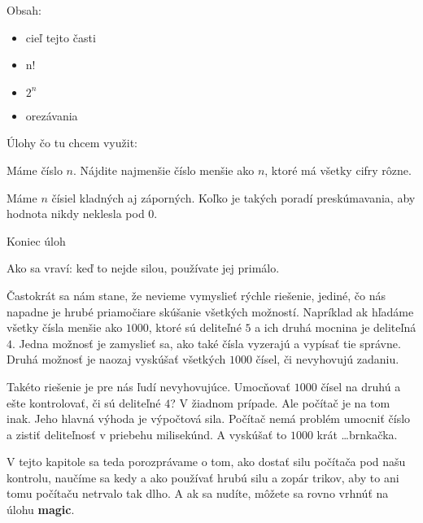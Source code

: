 





Obsah:
\begin{itemize}
    \item cieľ tejto časti
    \item n!
    \item $2^n$
    \item orezávania
\end{itemize}


Úlohy čo tu chcem využit:

Máme číslo $n$. Nájdite najmenšie číslo menšie ako $n$, ktoré má všetky cifry rôzne.

Máme $n$ čísiel kladných aj záporných. Koľko je takých poradí preskúmavania, aby hodnota nikdy
neklesla pod 0.

Koniec úloh


Ako sa vraví: keď to nejde silou, používate jej primálo.

Častokrát sa nám stane, že nevieme vymyslieť rýchle riešenie, jediné, čo nás napadne je hrubé
priamočiare skúšanie všetkých možností. Napríklad ak hľadáme všetky čísla menšie ako $1000$, ktoré
sú deliteľné $5$ a ich druhá mocnina je deliteľná $4$. Jedna možnosť je zamyslieť sa, ako také čísla
vyzerajú a vypísať tie správne. Druhá možnosť je naozaj vyskúšať všetkých $1000$ čísel, či
nevyhovujú zadaniu.

Takéto riešenie je pre nás ľudí nevyhovujúce. Umocňovať $1000$ čísel na druhú a ešte kontrolovať, či
sú deliteľné $4$? V žiadnom prípade. Ale počítač je na tom inak. Jeho hlavná výhoda je výpočtová
sila. Počítač nemá problém umocniť číslo a zistiť deliteľnosť v priebehu milisekúnd. A vyskúšať to
$1000$ krát \dots brnkačka.

V tejto kapitole sa teda porozprávame o tom, ako dostať silu počítača pod našu kontrolu, naučíme sa kedy a
ako používať hrubú silu a zopár trikov, aby to ani tomu počítaču netrvalo tak dlho. A ak sa nudíte,
môžete sa rovno vrhnúť na úlohu \textbf{magic}.

